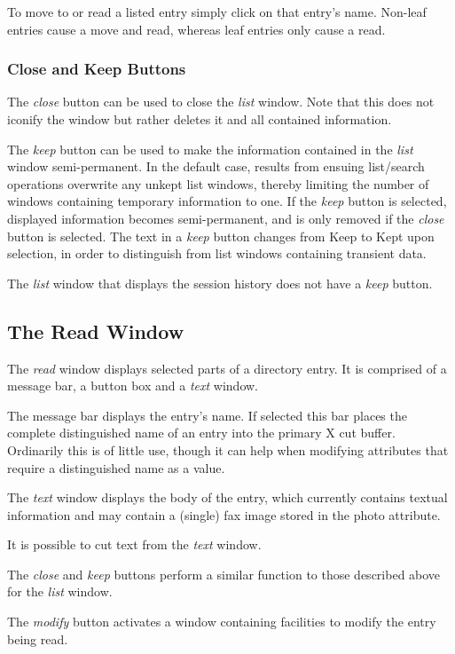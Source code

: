 To move to or read a listed entry simply click on that entry's name.
Non-leaf entries cause a move and read,
whereas leaf entries only cause a read.

\subsubsection {Close and Keep Buttons}

The {\em close} button can be used to close the {\em list} window.
Note that this does not iconify the window but rather deletes it and all
contained information.

The {\em keep} button can be used to make the information contained in
the {\em list}
window semi-permanent.
In the default case,
results from ensuing list/search operations overwrite any unkept list 
windows,
thereby limiting the number of windows containing temporary information to one.
If the {\em keep} button is selected,
displayed information becomes semi-permanent,
and is only removed if the {\em close} button is selected.
The text in a {\em keep} button changes from Keep to Kept upon selection,
in order to distinguish from list windows containing transient data.

The {\em list} window that displays the session history does not have
a {\em keep} button.

\subsection {The Read Window}

The {\em read} window displays selected parts of a directory entry.
It is comprised of a message bar, 
a button box and a {\em text} window.

The message bar displays the entry's name.
If selected this bar places the complete distinguished name of an entry
into the primary X cut buffer.
Ordinarily this is of little use,
though it can help when modifying attributes that require a distinguished name as
a value.

The {\em text} window displays the body of the entry,
which currently contains textual information and may contain
a (single) fax image stored in the photo attribute.

It is possible to cut text from the {\em text} window.

The {\em close} and {\em keep} buttons perform a similar function to those described above
for the {\em list} window.

The {\em modify} button activates a window containing facilities to modify the
entry being read.

